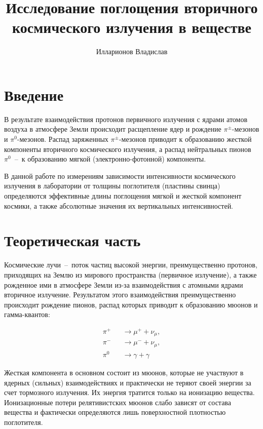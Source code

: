 \documentclass[reprint, nofootinbib, 10pt]{revtex4-2}
\begin{document}
\title{Исследование поглощения вторичного космического излучения в веществе}
\author{Илларионов Владислав}

\maketitle


\section*{Введение}

В результате взаимодействия протонов первичного излучения с ядрами атомов воздуха в
атмосфере Земли происходит расщепление ядер и рождение $\pi^{\pm}$-мезонов и
$\pi^0$-мезонов. Распад заряженных $\pi^{\pm}$-мезонов приводит к образованию жесткой
компоненты вторичного космического излучения, а распад нейтральных пионов $\pi^0$~--~к
образованию мягкой (электронно-фотонной) компоненты.

В данной работе по измерениям зависимости интенсивности космического излучения в
лаборатории от толщины поглотителя (пластины свинца) определяются эффективные длины
поглощения мягкой и жесткой компонент космики, а также абсолютные значения их вертикальных
интенсивностей.


\section*{Теоретическая часть}

Космические лучи~--~поток частиц высокой энергии, преимущественно протонов, приходящих
на Землю из мирового пространства (первичное излучение), а также рожденное ими в атмосфере
Земли из-за взаимодействия с атомными ядрами вторичное излучение. Результатом этого
взаимодействия преимущественно происходит рождение пионов, распад которых приводит к
образованию мюонов и гамма-квантов:

\begin{eqnarray*}
    \pi^+ &&\rightarrow \mu^+ + \nu_{\mu}, \\
    \pi^- &&\rightarrow \mu^- + \nu_{\mu}, \\
    \pi^0 &&\rightarrow \gamma + \gamma
\end{eqnarray*}

Жесткая компонента в основном состоит из мюонов, которые не участвуют в ядерных (сильных)
взаимодействиях и практически не теряют своей энергии за счет тормозного излучения. Их
энергия тратится только на ионизацию вещества. Ионизационные потери релятивистских мюонов
слабо зависят от состава вещества и фактически определяются лишь поверхностной плотностью
поглотителя.
\end{document}
